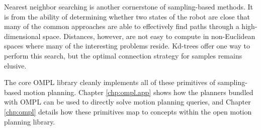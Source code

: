Nearest neighbor searching is another cornerstone of sampling-based methods.
It is from the ability of determining whether two states of the robot are close
that many of the common approaches are able to effectively find paths through a
high-dimensional space.  Distances, however, are not easy to compute in
non-Euclidean spaces where many of the interesting problems reside.  Kd-trees
offer one way to perform this search, but the optimal connection strategy for
samples remains elusive.

The core OMPL library cleanly implements all of these primitives of
sampling-based motion planning.  Chapter \ref{chp:ompl.app} shows how the
planners bundled with OMPL can be used to directly solve motion planning
queries, and Chapter \ref{chp:ompl} details how these primitives map to concepts
within the open motion planning library.
